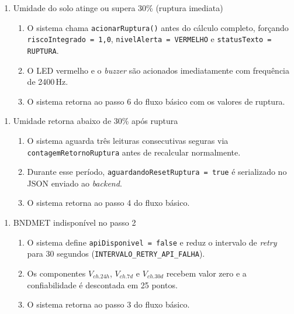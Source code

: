 \begin{enumerate}
  \renewcommand{\theenumi}{1a}
  \renewcommand{\labelenumi}{\theenumi.}
  \item Umidade do solo atinge ou supera 30\% (ruptura imediata)
  \begin{enumerate}
  \item O sistema chama \texttt{acionarRuptura()} antes do
        cálculo completo, forçando \texttt{riscoIntegrado = 1{,}0},
        \texttt{nivelAlerta = VERMELHO} e
        \texttt{statusTexto = RUPTURA}.
  \item O LED vermelho e o \textit{buzzer} são acionados
        imediatamente com frequência de 2400\,Hz.
  \item O sistema retorna ao passo 6 do fluxo básico com os
        valores de ruptura.
  \end{enumerate}
\end{enumerate}

\begin{enumerate}
  \renewcommand{\theenumi}{1b}
  \renewcommand{\labelenumi}{\theenumi.}
  \item Umidade retorna abaixo de 30\% após ruptura
  \begin{enumerate}
  \item O sistema aguarda três leituras consecutivas seguras
        via \texttt{contagemRetornoRuptura} antes de recalcular
        normalmente.
  \item Durante esse período, \texttt{aguardandoResetRuptura = true}
        é serializado no JSON enviado ao \textit{backend}.
  \item O sistema retorna ao passo 4 do fluxo básico.
  \end{enumerate}
\end{enumerate}

\begin{enumerate}
  \renewcommand{\theenumi}{2a}
  \renewcommand{\labelenumi}{\theenumi.}
  \item BNDMET indisponível no passo 2
  \begin{enumerate}
  \item O sistema define \texttt{apiDisponivel = false} e
        reduz o intervalo de \textit{retry} para 30 segundos
        (\texttt{INTERVALO\_RETRY\_API\_FALHA}).
  \item Os componentes $V_{ch.24h}$, $V_{ch.7d}$ e $V_{ch.30d}$
        recebem valor zero e a confiabilidade é descontada em
        25 pontos.
  \item O sistema retorna ao passo 3 do fluxo básico.
  \end{enumerate}
\end{enumerate}

